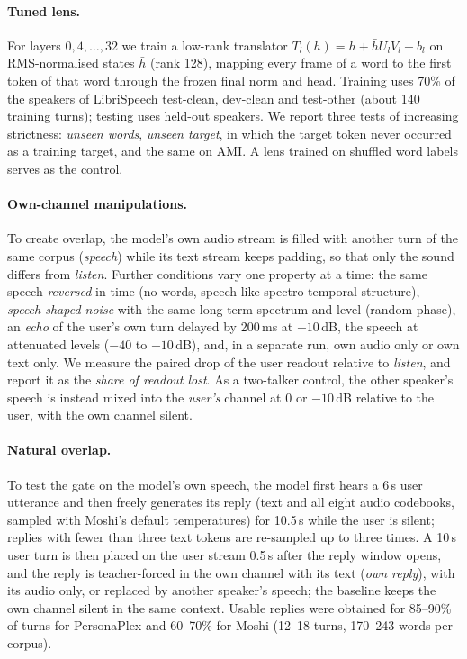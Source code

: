 \documentclass[11pt,a4paper]{article}
\newcommand{\PP}{PersonaPlex}
\begin{document}
\paragraph{Tuned lens.}
For layers $0,4,\dots,32$ we train a low-rank translator $T_l(h)=h+\bar h U_l V_l+b_l$ on RMS-normalised states $\bar h$ (rank 128), mapping every frame of a word to the first token of that word through the frozen final norm and head.
Training uses 70\% of the speakers of LibriSpeech test-clean, dev-clean and test-other (about 140 training turns); testing uses held-out speakers.
We report three tests of increasing strictness: \emph{unseen words}, \emph{unseen target}, in which the target token never occurred as a training target, and the same on AMI.
A lens trained on shuffled word labels serves as the control.

\paragraph{Own-channel manipulations.}
To create overlap, the model's own audio stream is filled with another turn of the same corpus (\emph{speech}) while its text stream keeps padding, so that only the sound differs from \emph{listen}.
Further conditions vary one property at a time: the same speech \emph{reversed} in time (no words, speech-like spectro-temporal structure), \emph{speech-shaped noise} with the same long-term spectrum and level (random phase), an \emph{echo} of the user's own turn delayed by 200\,ms at $-10$\,dB, the speech at attenuated levels ($-40$ to $-10$\,dB), and, in a separate run, own audio only or own text only.
We measure the paired drop of the user readout relative to \emph{listen}, and report it as the \emph{share of readout lost}.
As a two-talker control, the other speaker's speech is instead mixed into the \emph{user's} channel at 0 or $-10$\,dB relative to the user, with the own channel silent.

\paragraph{Natural overlap.}
To test the gate on the model's own speech, the model first hears a 6\,s user utterance and then freely generates its reply (text and all eight audio codebooks, sampled with Moshi's default temperatures) for 10.5\,s while the user is silent; replies with fewer than three text tokens are re-sampled up to three times.
A 10\,s user turn is then placed on the user stream 0.5\,s after the reply window opens, and the reply is teacher-forced in the own channel with its text (\emph{own reply}), with its audio only, or replaced by another speaker's speech; the baseline keeps the own channel silent in the same context.
Usable replies were obtained for 85--90\% of turns for \PP{} and 60--70\% for Moshi (12--18 turns, 170--243 words per corpus).
\end{document}
